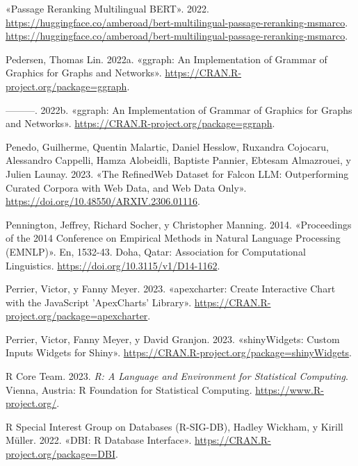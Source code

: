 \documentclass[
  12pt,
  openany]{book}
\newlength{\cslhangindent}
\newlength{\cslentryspacingunit} %
\newenvironment{CSLReferences}[2] %
 {%
  \setlength{\parindent}{0pt}
  \ifodd #1
  \let\oldpar\par
  \def\par{\hangindent=\cslhangindent\oldpar}
  \fi
  \setlength{\parskip}{#2\cslentryspacingunit}
 }%
 {}
\begin{document}
\begin{CSLReferences}{1}{0}
\leavevmode{}%
{«Passage Reranking Multilingual BERT»}. 2022. \url{https://huggingface.co/amberoad/bert-multilingual-passage-reranking-msmarco}. \url{https://huggingface.co/amberoad/bert-multilingual-passage-reranking-msmarco}.

\leavevmode{}%
Pedersen, Thomas Lin. 2022a. {«ggraph: An Implementation of Grammar of Graphics for Graphs and Networks»}. \url{https://CRAN.R-project.org/package=ggraph}.

\leavevmode{}%
---------. 2022b. {«ggraph: An Implementation of Grammar of Graphics for Graphs and Networks»}. \url{https://CRAN.R-project.org/package=ggraph}.

\leavevmode{}%
Penedo, Guilherme, Quentin Malartic, Daniel Hesslow, Ruxandra Cojocaru, Alessandro Cappelli, Hamza Alobeidli, Baptiste Pannier, Ebtesam Almazrouei, y Julien Launay. 2023. {«The RefinedWeb Dataset for Falcon LLM: Outperforming Curated Corpora with Web Data, and Web Data Only»}. \url{https://doi.org/10.48550/ARXIV.2306.01116}.

\leavevmode{}%
Pennington, Jeffrey, Richard Socher, y Christopher Manning. 2014. {«Proceedings of the 2014 Conference on Empirical Methods in Natural Language Processing (EMNLP)»}. En, 1532-43. Doha, Qatar: Association for Computational Linguistics. \url{https://doi.org/10.3115/v1/D14-1162}.

\leavevmode{}%
Perrier, Victor, y Fanny Meyer. 2023. {«apexcharter: Create Interactive Chart with the JavaScript 'ApexCharts' Library»}. \url{https://CRAN.R-project.org/package=apexcharter}.

\leavevmode{}%
Perrier, Victor, Fanny Meyer, y David Granjon. 2023. {«shinyWidgets: Custom Inputs Widgets for Shiny»}. \url{https://CRAN.R-project.org/package=shinyWidgets}.

\leavevmode{}%
R Core Team. 2023. \emph{R: A Language and Environment for Statistical Computing}. Vienna, Austria: R Foundation for Statistical Computing. \url{https://www.R-project.org/}.

\leavevmode{}%
R Special Interest Group on Databases (R-SIG-DB), Hadley Wickham, y Kirill Müller. 2022. {«DBI: R Database Interface»}. \url{https://CRAN.R-project.org/package=DBI}.


\end{CSLReferences}
\end{document}
